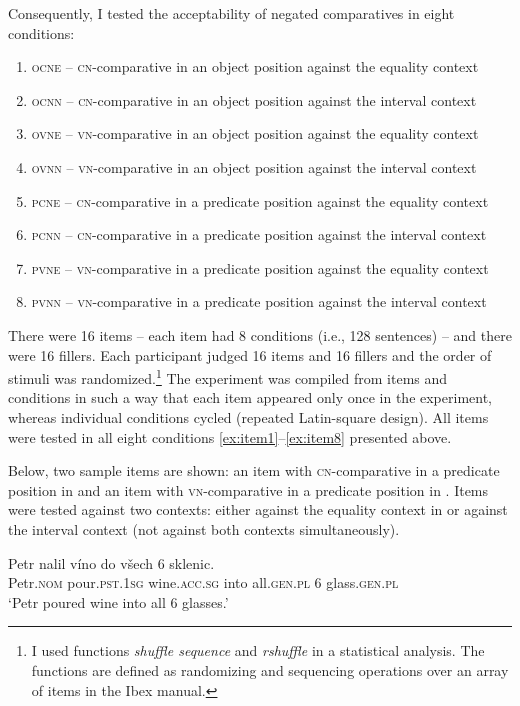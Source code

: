\documentclass[output=paper,
]{langscibook}
\begin{document}
Consequently, I tested the acceptability of negated comparatives in eight conditions:
\begin{enumerate}
\item \textsc{ocne} -- \textsc{cn-}comparative in an object position against the equality context \label{ex:item1}
\item \textsc{ocnn} -- \textsc{cn-}comparative in an object position against the interval context
\item \textsc{ovne} -- \textsc{vn-}comparative in an object position against the equality context
\item \textsc{ovnn} -- \textsc{vn-}comparative in an object position against the interval context
\item \textsc{pcne} -- \textsc{cn-}comparative in a predicate position against the equality context
\item \textsc{pcnn} -- \textsc{cn-}comparative in a predicate position against the interval context
\item \textsc{pvne} -- \textsc{vn-}comparative in a predicate position against the equality context
\item \textsc{pvnn} -- \textsc{vn-}comparative in a predicate position against the interval context \label{ex:item8}
\end{enumerate}

\noindent There were 16 items -- each item had 8 conditions (i.e., 128 sentences) -- and there were 16 fillers. Each participant judged 16 items and 16 fillers and the order of stimuli was randomized.\footnote{I used functions \textit{shuffle sequence} and \textit{rshuffle} in a statistical analysis. The functions are defined as randomizing and sequencing operations over an array of items in the Ibex manual.} The experiment was compiled from items and conditions in such a way that each item appeared only once in the experiment, whereas individual conditions cycled (repeated Latin-square design). All items were tested in all eight conditions \ref{ex:item1}--\ref{ex:item8} presented above. 

Below, two sample items are shown: an item with \textsc{cn-}comparative in a predicate position in  and an item with \textsc{vn-}comparative in a predicate position in . Items were tested against two contexts: either against the equality context in  or against the interval context  (not against both contexts simultaneously).


\ea 
\gll Petr nalil víno do všech 6 sklenic.\\
Petr.\textsc{nom} pour.\textsc{pst.1sg} wine.\textsc{acc.sg} into all.\textsc{gen.pl} 6 glass.\textsc{gen.pl}\\\hfill{}
\glt `Petr poured wine into all 6 glasses.' \label{ex:wine_e}
\z
\end{document}
